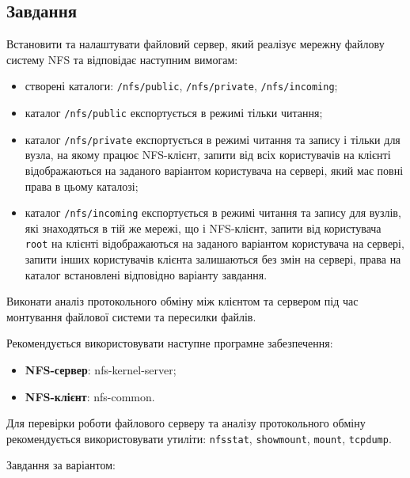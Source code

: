 \documentclass[14pt, a4paper]{extreport}
\begin{document}
	\subsection*{Завдання}
	
	Встановити та налаштувати файловий сервер, який реалізує мережну файлову систему NFS та відповідає наступним вимогам:
	
	\begin{itemize}
		\item створені каталоги: \texttt{/nfs/public}, \texttt{/nfs/private}, \texttt{/nfs/incoming};
		
		\item каталог \texttt{/nfs/public} експортується в режимі тільки читання;
		
		\item каталог \texttt{/nfs/private} експортується в режимі читання та запису і тільки для вузла, на якому працює NFS-клієнт, запити від всіх користувачів на клієнті відображаються на заданого варіантом користувача на сервері, який має повні права в цьому каталозі;
		
		\item каталог \texttt{/nfs/incoming} експортується в режимі читання та запису для вузлів, які знаходяться в тій же мережі, що і NFS-клієнт, запити від користувача \texttt{root} на клієнті відображаються на заданого варіантом користувача на сервері, запити інших користувачів клієнта залишаються без змін на сервері, права на каталог встановлені відповідно варіанту завдання.
	\end{itemize}
	
	Виконати аналіз протокольного обміну між клієнтом та сервером під час монтування файлової системи та пересилки файлів.
	
	Рекомендується використовувати наступне програмне забезпечення:
	
	\begin{itemize}
		\item \textbf{NFS-сервер}: nfs-kernel-server;
		
		\item \textbf{NFS-клієнт}: nfs-common.
	\end{itemize}
	
	Для перевірки роботи файлового серверу та аналізу протокольного обміну рекомендується використовувати утиліти: \texttt{nfsstat}, \texttt{showmount}, \texttt{mount}, \texttt{tcpdump}.
	
	Завдання за варіантом:
	
\end{document}
